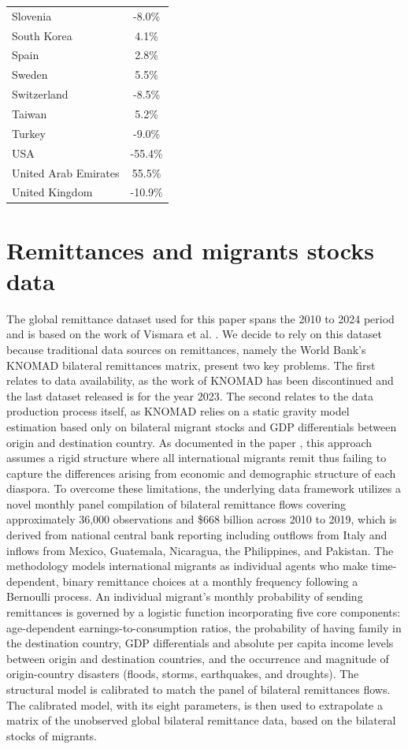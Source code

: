 \documentclass[fleqn,10pt,twocolumn]{wlscirep}
\begin{document}
\begin{table}[h!]
\begin{tabular}{lc}
		Slovenia & -8.0\% \\
		South Korea & 4.1\% \\
		Spain & 2.8\% \\
		Sweden & 5.5\% \\
		Switzerland & -8.5\% \\
		Taiwan & 5.2\% \\
		Turkey & -9.0\% \\
		USA & -55.4\% \\
		United Arab Emirates & 55.5\% \\
		United Kingdom & -10.9\% \\
		\bottomrule
	\end{tabular}
\end{table}



\section{Remittances and migrants stocks data}
\label{sec:rem_data_sm}
The global remittance dataset used for this paper spans the 2010 to 2024 period and is based on the work of Vismara et al. \cite{vismara2025migrants}. We decide to rely on this dataset because traditional data sources on remittances, namely the World Bank's KNOMAD bilateral remittances matrix, present two key problems. The first relates to data availability, as the work of KNOMAD has been discontinued and the last dataset released is for the year 2023. The second relates to the data production process itself, as KNOMAD relies on a static gravity model estimation based only on bilateral migrant stocks and GDP differentials between origin and destination country. As documented in the paper \cite{vismara2025migrants}, this approach assumes a rigid structure where all international migrants remit thus failing to capture the differences arising from economic and demographic structure of each diaspora. To overcome these limitations, the underlying data framework utilizes a novel monthly panel compilation of bilateral remittance flows covering approximately 36,000 observations and \$668 billion across 2010 to 2019, which is derived from national central bank reporting including outflows from Italy and inflows from Mexico, Guatemala, Nicaragua, the Philippines, and Pakistan. The methodology models international migrants as individual agents who make time-dependent, binary remittance choices at a monthly frequency following a Bernoulli process. An individual migrant's monthly probability of sending remittances is governed by a logistic function incorporating five core components: age-dependent earnings-to-consumption ratios, the probability of having family in the destination country, GDP differentials and absolute per capita income levels between origin and destination countries, and the occurrence and magnitude of origin-country disasters (floods, storms, earthquakes, and droughts). The structural model is calibrated to match the panel of bilateral remittances flows. The calibrated model, with its eight parameters, is then used to extrapolate a matrix of the unobserved global bilateral remittance data, based on the bilateral stocks of migrants.
\end{document}
